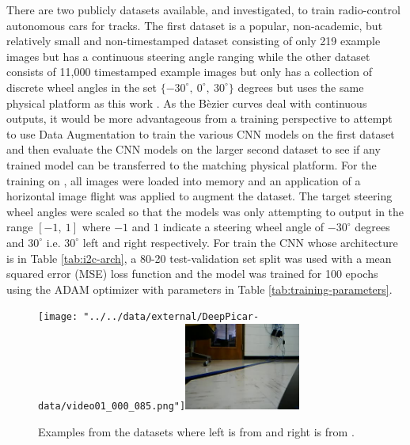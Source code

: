 \documentclass[conference]{IEEEtran}
\begin{document}
There are two publicly datasets available, and investigated, to train radio-control autonomous cars for tracks. The first dataset is a popular, non-academic, but relatively small and non-timestamped dataset consisting of only 219 example images but has a continuous steering angle ranging \cite{tian2019} while the other dataset consists of 11,000 timestamped example images but only has a collection of discrete wheel angles in the set $\lbrace -30^\circ,\ 0^\circ,\ 30^\circ \rbrace$ degrees but uses the same physical platform as this work \cite{bechtel2018}. As the B\`ezier curves deal with continuous outputs, it would be more advantageous from a training perspective to attempt to use Data Augmentation to train the various CNN models on the first dataset and then evaluate the CNN models on the larger second dataset to see if any trained model can be transferred to the matching physical platform. For the training on \cite{tian2019}, all images were loaded into memory and an application of a horizontal image flight was applied to augment the dataset. The target steering wheel angles were scaled so that the models was only attempting to output in the range $[-1,\ 1]$ where $-1$ and $1$ indicate a steering wheel angle of $-30^\circ$ degrees and $30^\circ$ i.e. $30^\circ$ left and right respectively. For train the CNN whose architecture is in Table \ref{tab:i2c-arch}, a 80-20 test-validation set split was used with a mean squared error (MSE) loss function and the model was trained for 100 epochs using the ADAM optimizer with parameters in Table \ref{tab:training-parameters}.

\begin{figure}[tbhp]
	\centerline{\texttt{[image: "../../data/external/DeepPicar-data/video01\_000\_085.png"]}\hspace*{0.1in}\includegraphics[width=1.5in]{../figures/presentation/out-video-1-moment.jpg}}
	\caption{Examples from the datasets where left is from \cite{tian2019} and right is from \cite{bechtel2018}.}
\end{figure}
\end{document}
